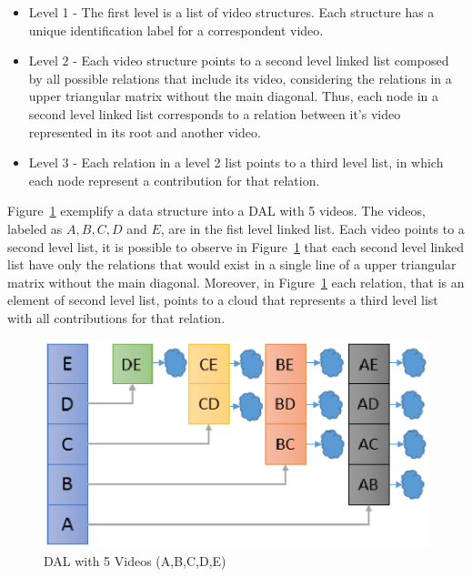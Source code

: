 \begin{itemize}

\item Level 1 - The first level is a list of video structures. Each structure has a unique identification label for a correspondent video. 

\item Level 2 - Each video structure points to a second level linked list composed by all possible relations that include its video, considering the relations in a upper triangular matrix without the main diagonal.  Thus, each node in a second level linked list corresponds to a relation between it's video represented in its root and another video.

\item Level 3 - Each relation in a level 2 list points to a third level list, in which each node represent a contribution for that relation.

\end{itemize}

Figure~\ref{dal} exemplify a data structure into a DAL with 5 videos. The videos, labeled as $A, B, C, D$  and $E$, are in the fist level linked list. Each video points to a second level list, it is possible to observe in Figure~\ref{dal}  that each second level linked list have only the relations that would exist in a single line of a upper triangular matrix without the main diagonal. Moreover, in Figure~\ref{dal} each relation, that is an element of second level list, points to a cloud that represents a third level list with all contributions for that relation.

\begin{figure}
	\centering
	\includegraphics[scale=0.8]{figures/dal}
	\caption{DAL with 5 Videos (A,B,C,D,E)}
	\label{dal}
\end{figure}

